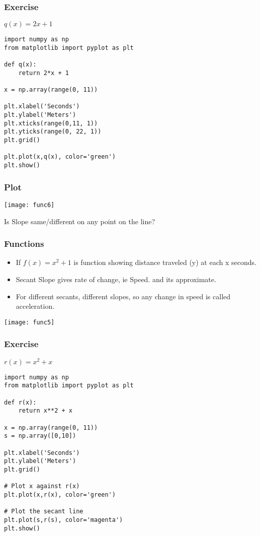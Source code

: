  \begin{frame}[fragile]\frametitle{Exercise}
$q(x) = 2x+1$

\begin{lstlisting}
import numpy as np
from matplotlib import pyplot as plt

def q(x):
    return 2*x + 1
		
x = np.array(range(0, 11))

plt.xlabel('Seconds')
plt.ylabel('Meters')
plt.xticks(range(0,11, 1))
plt.yticks(range(0, 22, 1))
plt.grid()

plt.plot(x,q(x), color='green')
plt.show()
\end{lstlisting}
\end{frame}


 \begin{frame}[fragile]\frametitle{Plot}
\begin{center}
\texttt{[image: func6]}
\end{center}

Is Slope same/different on any point on the line?

\end{frame}

 \begin{frame}[fragile]\frametitle{Functions}
\begin{itemize}
\item If $f(x) = x^2 + 1$ is function showing distance traveled (y) at each x seconds.
\item Secant Slope gives rate of change, ie Speed. and its approximate.
\item For different secants, different slopes, so any change in speed is called acceleration.
\end{itemize}
\begin{center}
\texttt{[image: func5]}
\end{center}
\end{frame}


 \begin{frame}[fragile]\frametitle{Exercise}
$r(x) = x^2 + x$

\begin{lstlisting}
import numpy as np
from matplotlib import pyplot as plt

def r(x):
    return x**2 + x

x = np.array(range(0, 11))
s = np.array([0,10])

plt.xlabel('Seconds')
plt.ylabel('Meters')
plt.grid()

# Plot x against r(x)
plt.plot(x,r(x), color='green')

# Plot the secant line
plt.plot(s,r(s), color='magenta')
plt.show()
\end{lstlisting}
\end{frame}


